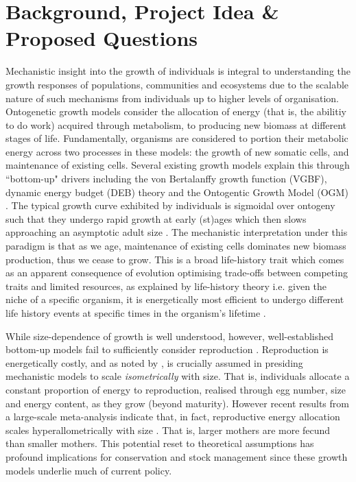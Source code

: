 \documentclass[11pt]{article}
\begin{document}
    \section{Background, Project Idea \& Proposed Questions}
    \linenumbers
        Mechanistic insight into the growth of individuals is integral to understanding the growth responses of populations, communities and ecosystems due to the scalable nature of such mechanisms from individuals up to higher levels of organisation. Ontogenetic growth models consider the allocation of energy (that is, the abilitiy to do work) acquired through metabolism, to producing new biomass at different stages of life. Fundamentally, organisms are considered to portion their metabolic energy across two processes in these models: the growth of new somatic cells, and maintenance of existing cells. Several existing growth models explain this through ``bottom-up" drivers including the von Bertalanffy growth function (VGBF), dynamic energy budget (DEB) theory and the Ontogentic Growth Model (OGM) . The typical growth curve exhibited by individuals is sigmoidal over ontogeny such that they undergo rapid growth at early (st)ages which then slows approaching an asymptotic adult size . The mechanistic interpretation under this paradigm is that as we age, maintenance of existing cells dominates new biomass production, thus we cease to grow. This is a broad life-history trait which comes as an apparent consequence of evolution optimising trade-offs between competing traits and limited resources, as explained by life-history theory i.e. given the niche of a specific organism, it is energetically most efficient to undergo different life history events at specific times in the organism's lifetime . 
        
        While size-dependence of growth is well understood, however, well-established bottom-up models fail to sufficiently consider reproduction . Reproduction is energetically costly, and as noted by , is crucially assumed in presiding mechanistic models to scale \textit{isometrically} with size. That is, individuals allocate a constant proportion of energy to reproduction, realised through egg number, size and energy content, as they grow (beyond maturity). However recent results from a large-scale meta-analysis indicate that, in fact, reproductive energy allocation scales hyperallometrically with size . That is, larger mothers are more fecund than smaller mothers. This potential reset to theoretical assumptions has profound implications for conservation and stock management since these growth models underlie much of current policy.
\end{document}
